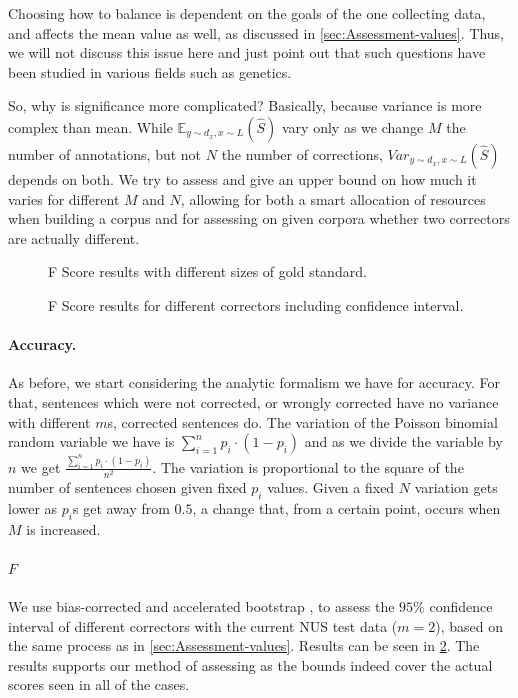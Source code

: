 \documentclass[english]{article}
\begin{document}
Choosing how to balance is dependent on the goals of the one collecting data, and affects the mean value as well, as discussed in \ref{sec:Assessment-values}. Thus, we will not discuss this issue here and just point out that such questions have been studied in various fields such as genetics\cite{ionita2010optimal}.

So, why is significance more complicated? Basically, because variance is more complex than mean. While $\mathbb{E}_{y\sim d_x, x\sim L}\left(\hat{S}\right)$ vary only as we change $M$
the number of annotations, but not $N$ the number of corrections,
$Var_{y\sim d_x, x\sim L}(\hat{S})$ depends on both. We try to assess and give an upper
bound on how much it varies for different $M$ and $N$, allowing
for both a smart allocation of resources when building a corpus and for assessing on given corpora whether two correctors are actually different.

\begin{figure}
	\caption{F Score results with different sizes of gold standard.}
	\label{tab:F_Ms}
\end{figure}
\begin{figure}
	\caption{F Score results for different correctors including confidence interval.}
	\label{fig:F_correctors}
\end{figure}


\paragraph{Accuracy.} As before, we start considering the analytic formalism we have for accuracy. For that, sentences which were not corrected, or wrongly corrected have no variance with different $m$s, corrected sentences do. The variation of the Poisson binomial random variable we have is $\sum_{i=1}^{n}p_i\cdot\left(1-p_i\right)$ and as we divide the variable by $n$ we get $\frac{\sum_{i=1}^{n}p_i\cdot\left(1-p_i\right)}{n^2}$. 
The variation is proportional to the square of the number of sentences chosen given fixed $p_i$ values. Given a fixed $N$ variation gets lower as $p_i$s get away from $0.5$, a change that, from a certain point, occurs when $M$ is increased.

\paragraph{$F$} We use bias-corrected and accelerated bootstrap \cite{efron1987better}, to assess the $95\%$ confidence interval of different correctors with the current NUS test data ($m=2$), based on the same process as in \ref{sec:Assessment-values}. Results can be seen in \ref{fig:F_correctors}. The results supports our method of assessing as the bounds indeed cover the actual scores seen in all of the cases.
\end{document}
